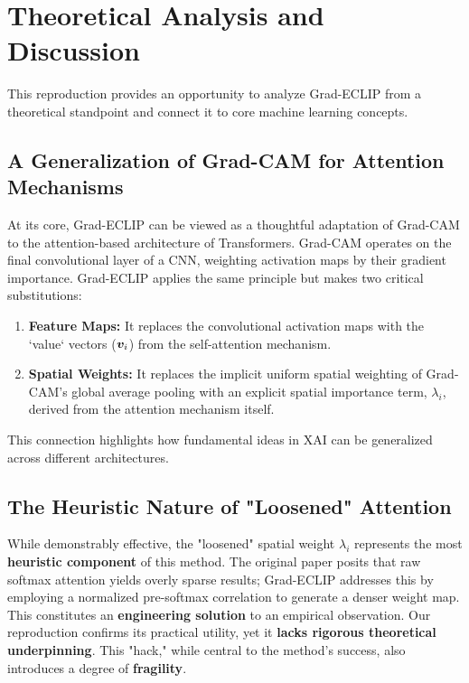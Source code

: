 \documentclass[10pt]{article} %
\begin{document}
\section{Theoretical Analysis and Discussion}
\label{others}

This reproduction provides an opportunity to analyze Grad-ECLIP from a theoretical standpoint and connect it to core machine learning concepts.

\subsection{A Generalization of Grad-CAM for Attention Mechanisms}

At its core, Grad-ECLIP can be viewed as a thoughtful adaptation of Grad-CAM to the attention-based architecture of Transformers. Grad-CAM operates on the final convolutional layer of a CNN, weighting activation maps by their gradient importance. Grad-ECLIP applies the same principle but makes two critical substitutions:
\begin{enumerate}
    \item \textbf{Feature Maps:} It replaces the convolutional activation maps with the `value` vectors (${\bm{v}}_i$) from the self-attention mechanism.
    \item \textbf{Spatial Weights:} It replaces the implicit uniform spatial weighting of Grad-CAM's global average pooling with an explicit spatial importance term, $\lambda_i$, derived from the attention mechanism itself.
\end{enumerate}
This connection highlights how fundamental ideas in XAI can be generalized across different architectures.

\subsection{The Heuristic Nature of "Loosened" Attention}

While demonstrably effective, the "loosened" spatial weight $\lambda_i$ represents the most \textbf{heuristic component} of this method. The original paper posits that raw softmax attention yields overly sparse results; Grad-ECLIP addresses this by employing a normalized pre-softmax correlation to generate a denser weight map. This constitutes an \textbf{engineering solution} to an empirical observation. Our reproduction confirms its practical utility, yet it \textbf{lacks rigorous theoretical underpinning}. This "hack," while central to the method's success, also introduces a degree of \textbf{fragility}.
\end{document}
